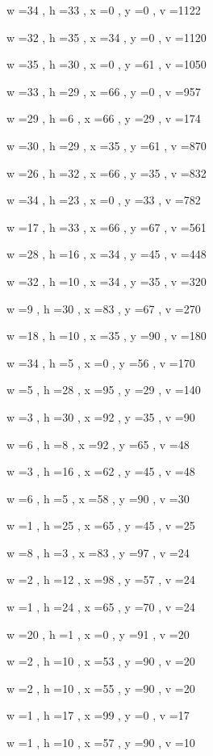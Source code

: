 \documentclass[11pt]{article}
\begin{document}
w =34 , h =33 , x =0 , y =0 , v =1122
\par
w =32 , h =35 , x =34 , y =0 , v =1120
\par
w =35 , h =30 , x =0 , y =61 , v =1050
\par
w =33 , h =29 , x =66 , y =0 , v =957
\par
w =29 , h =6 , x =66 , y =29 , v =174
\par
w =30 , h =29 , x =35 , y =61 , v =870
\par
w =26 , h =32 , x =66 , y =35 , v =832
\par
w =34 , h =23 , x =0 , y =33 , v =782
\par
w =17 , h =33 , x =66 , y =67 , v =561
\par
w =28 , h =16 , x =34 , y =45 , v =448
\par
w =32 , h =10 , x =34 , y =35 , v =320
\par
w =9 , h =30 , x =83 , y =67 , v =270
\par
w =18 , h =10 , x =35 , y =90 , v =180
\par
w =34 , h =5 , x =0 , y =56 , v =170
\par
w =5 , h =28 , x =95 , y =29 , v =140
\par
w =3 , h =30 , x =92 , y =35 , v =90
\par
w =6 , h =8 , x =92 , y =65 , v =48
\par
w =3 , h =16 , x =62 , y =45 , v =48
\par
w =6 , h =5 , x =58 , y =90 , v =30
\par
w =1 , h =25 , x =65 , y =45 , v =25
\par
w =8 , h =3 , x =83 , y =97 , v =24
\par
w =2 , h =12 , x =98 , y =57 , v =24
\par
w =1 , h =24 , x =65 , y =70 , v =24
\par
w =20 , h =1 , x =0 , y =91 , v =20
\par
w =2 , h =10 , x =53 , y =90 , v =20
\par
w =2 , h =10 , x =55 , y =90 , v =20
\par
w =1 , h =17 , x =99 , y =0 , v =17
\par
w =1 , h =10 , x =57 , y =90 , v =10
\par
\newpage
\end{document}
